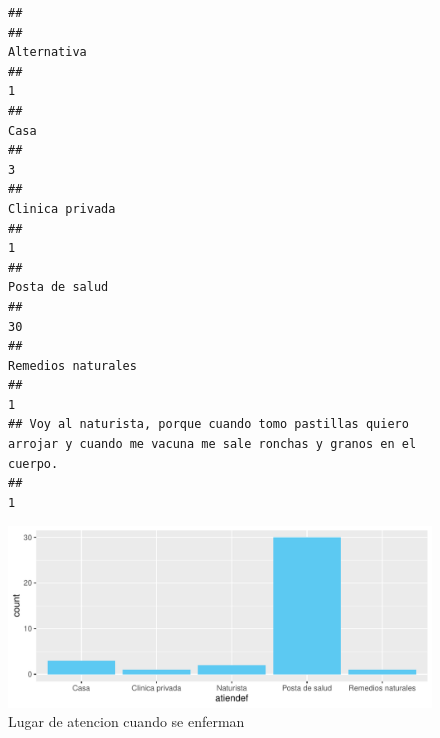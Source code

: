 \documentclass[12pt]{article}\usepackage[]{graphicx}\usepackage[]{xcolor}
\makeatletter
\def\maxwidth{ %
  \ifdim\Gin@nat@width>\linewidth
    \linewidth
  \else
    \Gin@nat@width
  \fi
}
\newenvironment{kframe}{%
 \def\at@end@of@kframe{}%
 \ifinner\ifhmode%
  \def\at@end@of@kframe{\end{minipage}}%
  \begin{minipage}{\columnwidth}%
 \fi\fi%
 \def\FrameCommand##1{\hskip\@totalleftmargin \hskip-\fboxsep
 \colorbox{shadecolor}{##1}\hskip-\fboxsep
     \hskip-\linewidth \hskip-\@totalleftmargin \hskip\columnwidth}%
 \MakeFramed {\advance\hsize-\width
   \@totalleftmargin\z@ \linewidth\hsize
   \@setminipage}}%
 {\par\unskip\endMakeFramed%
 \at@end@of@kframe}
\newenvironment{knitrout}{}{} %
\makeatother
\begin{document}
	\begin{figure}[H]
	\centering
\begin{knitrout}
\color{fgcolor}\begin{kframe}
\begin{verbatim}
## 
##                                                                                                             Alternativa 
##                                                                                                                       1 
##                                                                                                                    Casa 
##                                                                                                                       3 
##                                                                                                         Clinica privada 
##                                                                                                                       1 
##                                                                                                          Posta de salud 
##                                                                                                                      30 
##                                                                                                      Remedios naturales 
##                                                                                                                       1 
## Voy al naturista, porque cuando tomo pastillas quiero arrojar y cuando me vacuna me sale ronchas y granos en el cuerpo. 
##                                                                                                                       1
\end{verbatim}
\end{kframe}
\includegraphics[width=\maxwidth]{figure/once-1} 
\end{knitrout}
	\caption{Lugar de atencion cuando se enferman}
	\end{figure}
\end{document}
